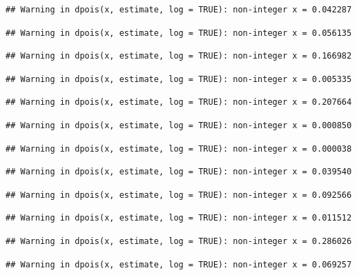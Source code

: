 \documentclass[]{article}
\begin{document}
\begin{verbatim}
## Warning in dpois(x, estimate, log = TRUE): non-integer x = 0.042287
\end{verbatim}

\begin{verbatim}
## Warning in dpois(x, estimate, log = TRUE): non-integer x = 0.056135
\end{verbatim}

\begin{verbatim}
## Warning in dpois(x, estimate, log = TRUE): non-integer x = 0.166982
\end{verbatim}

\begin{verbatim}
## Warning in dpois(x, estimate, log = TRUE): non-integer x = 0.005335
\end{verbatim}

\begin{verbatim}
## Warning in dpois(x, estimate, log = TRUE): non-integer x = 0.207664
\end{verbatim}

\begin{verbatim}
## Warning in dpois(x, estimate, log = TRUE): non-integer x = 0.000850
\end{verbatim}

\begin{verbatim}
## Warning in dpois(x, estimate, log = TRUE): non-integer x = 0.000038
\end{verbatim}

\begin{verbatim}
## Warning in dpois(x, estimate, log = TRUE): non-integer x = 0.039540
\end{verbatim}

\begin{verbatim}
## Warning in dpois(x, estimate, log = TRUE): non-integer x = 0.092566
\end{verbatim}

\begin{verbatim}
## Warning in dpois(x, estimate, log = TRUE): non-integer x = 0.011512
\end{verbatim}

\begin{verbatim}
## Warning in dpois(x, estimate, log = TRUE): non-integer x = 0.286026
\end{verbatim}

\begin{verbatim}
## Warning in dpois(x, estimate, log = TRUE): non-integer x = 0.069257
\end{verbatim}
\end{document}
